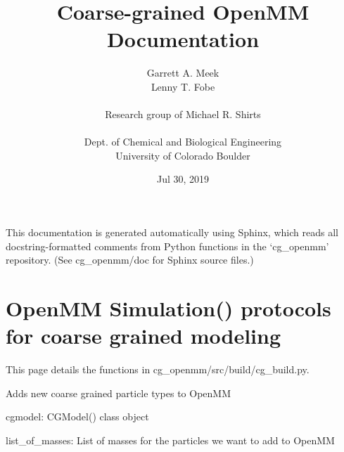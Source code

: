 \documentclass[letterpaper,12pt,english,openany,oneside]{sphinxmanual}
\title{Coarse-grained OpenMM Documentation}
\date{Jul 30, 2019}
\author{Garrett A. Meek\\Lenny T. Fobe\\ \\Research group of Michael R. Shirts\\ \\Dept. of Chemical and Biological Engineering\\University of Colorado Boulder}
\begin{document}
\pagestyle{empty}
\sphinxmaketitle
\pagestyle{plain}
\sphinxtableofcontents
\pagestyle{normal}
\label{\detokenize{index::doc}}


This documentation is generated automatically using Sphinx, which reads all docstring-formatted comments from Python functions in the ‘cg\_openmm’ repository.  (See cg\_openmm/doc for Sphinx source files.)


\chapter{OpenMM Simulation() protocols for coarse grained modeling}
\label{\detokenize{build:openmm-simulation-protocols-for-coarse-grained-modeling}}\label{\detokenize{build::doc}}
This page details the functions in cg\_openmm/src/build/cg\_build.py.

\label{\detokenize{build:module-build.cg_build}}

\begin{fulllineitems}
\label{\detokenize{build:build.cg_build.add_force}}
\end{fulllineitems}


\begin{fulllineitems}
\label{\detokenize{build:build.cg_build.add_new_elements}}
Adds new coarse grained particle types to OpenMM

cgmodel: CGModel() class object

list\_of\_masses: List of masses for the particles we want to add to OpenMM

\end{fulllineitems}

\end{document}
